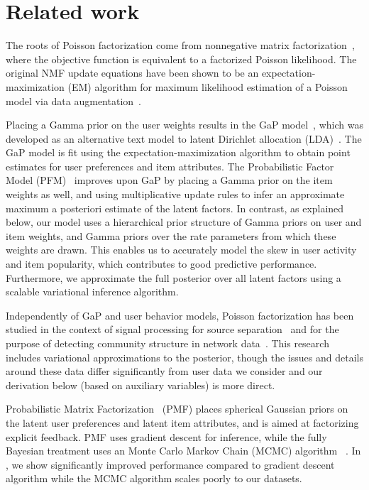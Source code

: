\section{Related work}
The roots of Poisson factorization come from nonnegative matrix
factorization~\cite{Lee:1999}, where the objective function is
equivalent to a factorized Poisson likelihood.  The original NMF
update equations have been shown to be an expectation-maximization
(EM) algorithm for maximum likelihood estimation of a Poisson model
via data augmentation~\cite{Cemgil:2009}.

Placing a Gamma prior on the user weights results in the GaP
model~\cite{Canny:2004}, which was developed as an alternative text
model to latent Dirichlet allocation
(LDA)~\cite{Blei:2003b,Inouye:2014}. The GaP model is fit using the
expectation-maximization algorithm to obtain point estimates for user
preferences and item attributes. The Probabilistic Factor Model
(PFM)~\cite{Ma:2011} improves upon GaP by placing a Gamma prior on the
item weights as well, and using multiplicative update rules to infer
an approximate maximum a posteriori estimate of the latent factors.
In contrast, as explained below, our model uses a hierarchical prior
structure of Gamma priors on user and item weights, and Gamma priors
over the rate parameters from which these weights are drawn. This
enables us to accurately model the skew in user activity and item
popularity, which contributes to good predictive
performance. Furthermore, we approximate the full posterior over all
latent factors using a scalable variational inference algorithm.

Independently of GaP and user behavior models, Poisson factorization
has been studied in the context of signal processing for source
separation~\cite{Cemgil:2009,Hoffman:2012} and for the purpose of
detecting community structure in network
data~\cite{Ball:2011,Gopalan:2013}. This research includes variational
approximations to the posterior, though the issues and details around
these data differ significantly from user data we consider and our
derivation below (based on auxiliary variables) is more direct.

Probabilistic Matrix Factorization~\cite{Salakhutdinov:2008a} (PMF)
places spherical Gaussian priors on the latent user preferences and
latent item attributes, and is aimed at factorizing explicit feedback.
PMF uses gradient descent for inference, while the fully Bayesian
treatment uses an Monte Carlo Markov Chain (MCMC) algorithm
~\cite{Salakhutdinov:2008}.  In , we show significantly
improved performance compared to gradient descent algorithm while the
MCMC algorithm scales poorly to our datasets.

